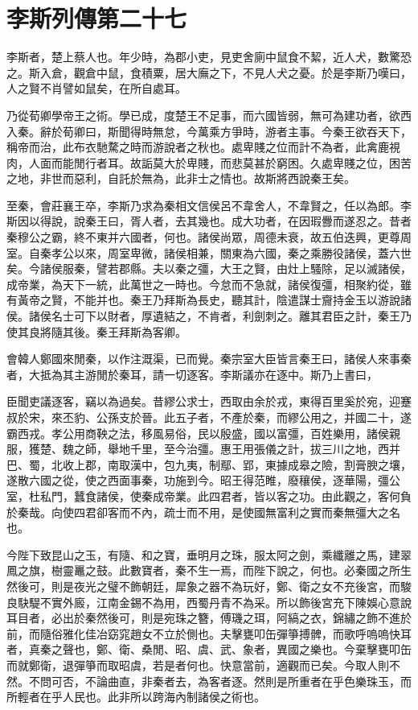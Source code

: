 \chapter{李斯列傳第二十七}

李斯者，楚上蔡人也。年少時，為郡小吏，見吏舍廁中鼠食不絜，近人犬，數驚恐之。斯入倉，觀倉中鼠，食積粟，居大廡之下，不見人犬之憂。於是李斯乃嘆曰，人之賢不肖譬如鼠矣，在所自處耳。

乃從荀卿學帝王之術。學已成，度楚王不足事，而六國皆弱，無可為建功者，欲西入秦。辭於荀卿曰，斯聞得時無怠，今萬乘方爭時，游者主事。今秦王欲吞天下，稱帝而治，此布衣馳騖之時而游說者之秋也。處卑賤之位而計不為者，此禽鹿視肉，人面而能閒行者耳。故詬莫大於卑賤，而悲莫甚於窮困。久處卑賤之位，困苦之地，非世而惡利，自託於無為，此非士之情也。故斯將西說秦王矣。

至秦，會莊襄王卒，李斯乃求為秦相文信侯呂不韋舍人，不韋賢之，任以為郎。李斯因以得說，說秦王曰，胥人者，去其幾也。成大功者，在因瑕釁而遂忍之。昔者秦穆公之霸，終不東并六國者，何也。諸侯尚眾，周德未衰，故五伯迭興，更尊周室。自秦孝公以來，周室卑微，諸侯相兼，關東為六國，秦之乘勝役諸侯，蓋六世矣。今諸侯服秦，譬若郡縣。夫以秦之彊，大王之賢，由灶上騷除，足以滅諸侯，成帝業，為天下一統，此萬世之一時也。今怠而不急就，諸侯復彊，相聚約從，雖有黃帝之賢，不能并也。秦王乃拜斯為長史，聽其計，陰遣謀士齎持金玉以游說諸侯。諸侯名士可下以財者，厚遺結之，不肯者，利劍刺之。離其君臣之計，秦王乃使其良將隨其後。秦王拜斯為客卿。

會韓人鄭國來閒秦，以作注溉渠，已而覺。秦宗室大臣皆言秦王曰，諸侯人來事秦者，大抵為其主游閒於秦耳，請一切逐客。李斯議亦在逐中。斯乃上書曰，

臣聞吏議逐客，竊以為過矣。昔繆公求士，西取由余於戎，東得百里奚於宛，迎蹇叔於宋，來丕豹、公孫支於晉。此五子者，不產於秦，而繆公用之，并國二十，遂霸西戎。孝公用商鞅之法，移風易俗，民以殷盛，國以富彊，百姓樂用，諸侯親服，獲楚、魏之師，舉地千里，至今治彊。惠王用張儀之計，拔三川之地，西并巴、蜀，北收上郡，南取漢中，包九夷，制鄢、郢，東據成皋之險，割膏腴之壤，遂散六國之從，使之西面事秦，功施到今。昭王得范睢，廢穰侯，逐華陽，彊公室，杜私門，蠶食諸侯，使秦成帝業。此四君者，皆以客之功。由此觀之，客何負於秦哉。向使四君卻客而不內，疏士而不用，是使國無富利之實而秦無彊大之名也。

今陛下致昆山之玉，有隨、和之寶，垂明月之珠，服太阿之劍，乘纖離之馬，建翠鳳之旗，樹靈鼉之鼓。此數寶者，秦不生一焉，而陛下說之，何也。必秦國之所生然後可，則是夜光之璧不飾朝廷，犀象之器不為玩好，鄭、衛之女不充後宮，而駿良駃騠不實外廄，江南金錫不為用，西蜀丹青不為采。所以飾後宮充下陳娛心意說耳目者，必出於秦然後可，則是宛珠之簪，傅璣之珥，阿縞之衣，錦繡之飾不進於前，而隨俗雅化佳冶窈窕趙女不立於側也。夫擊甕叩缶彈箏搏髀，而歌呼嗚嗚快耳者，真秦之聲也，鄭、衛、桑閒、昭、虞、武、象者，異國之樂也。今棄擊甕叩缶而就鄭衛，退彈箏而取昭虞，若是者何也。快意當前，適觀而已矣。今取人則不然。不問可否，不論曲直，非秦者去，為客者逐。然則是所重者在乎色樂珠玉，而所輕者在乎人民也。此非所以跨海內制諸侯之術也。

